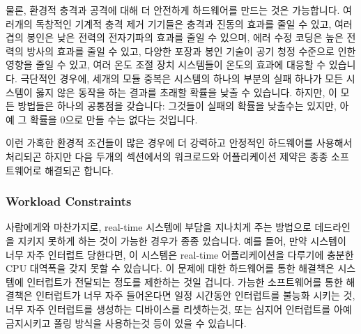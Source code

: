 물론, 환경적 충격과 공격에 대해 더 안전하게 하드웨어를 만드는 것은 가능합니다.
여러개의 독창적인 기계적 충격 제거 기기들은 충격과 진동의 효과를 줄일 수 있고,
여러겹의 봉인은 낮은 전력의 전자기파의 효과를 줄일 수 있으며, 에러 수정 코딩은
높은 전력의 방사의 효과를 줄일 수 있고, 다양한 포장과 봉인 기술이 공기 청정
수준으로 인한 영향을 줄일 수 있고, 여러 온도 조절 장치 시스템들이 온도의 효과에
대응할 수 있습니다.
극단적인 경우에, 세개의 모듈 중복은 시스템의 하나의 부분의 실패 하나가 모든
시스템이 옳지 않은 동작을 하는 결과를 초래할 확률을 낮출 수 있습니다.
하지만, 이 모든 방법들은 하나의 공통점을 갖습니다: 그것들이 실패의 확률을
낮출수는 있지만, 아예 그 확률을 0으로 만들 수는 없다는 것입니다.

이런 가혹한 환경적 조건들이 많은 경우에 더 강력하고 안정적인 하드웨어를
사용해서 처리되곤 하지만 다음 두개의 섹션에서의 워크로드와 어플리케이션 제약은
종종 소프트웨어로 해결되곤 합니다.

\subsubsection{Workload Constraints}
\label{sec:rt:Workload Constraints}

사람에게와 마찬가지로, real-time 시스템에 부담을 지나치게 주는 방법으로
데드라인을 지키지 못하게 하는 것이 가능한 경우가 종종 있습니다.
예를 들어, 만약 시스템이 너무 자주 인터럽트 당한다면, 이 시스템은 real-time
어플리케이션을 다루기에 충분한 CPU 대역폭을 갖지 못할 수 있습니다.
이 문제에 대한 하드웨어를 통한 해결책은 시스템에 인터럽트가 전달되는 정도를
제한하는 것일 겁니다.
가능한 소프트웨어를 통한 해결책은 인터럽트가 너무 자주 들어온다면 일정 시간동안
인터럽트를 불능화 시키는 것, 너무 자주 인터럽트를 생성하는 디바이스를
리셋하는것, 또는 심지어 인터럽트를 아예 금지시키고 폴링 방식을 사용하는것 등이
있을 수 있습니다.
\iffalse

